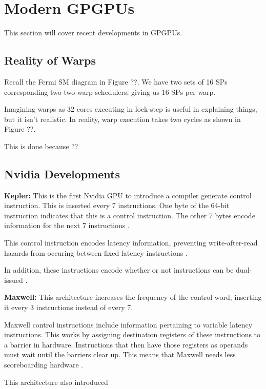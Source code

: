 \section{Modern GPGPUs}

This section will cover recent developments in GPGPUs.

\subsection{Reality of Warps}

Recall the Fermi SM diagram in Figure ??. We have two sets of 16 SPs corresponding
two two warp schedulers, giving us 16 SPs per warp.

Imagining warps as 32 cores executing in lock-step is useful in explaining things,
but it isn't realistic. In reality, warp execution takes two cycles as shown
in Figure ??.

This is done because ??

\subsection{Nvidia Developments}

\textbf{Kepler:} This is the first Nvidia GPU to introduce a compiler generate control instruction.
This is inserted every 7 instructions. One byte of the 64-bit instruction indicates
that this is a control instruction. The other 7 bytes encode information for the
next 7 instructions \cite{chipsandcheeseInsideKepler}.

This control instruction encodes latency information, preventing write-after-read hazards
from occuring between fixed-latency instructions \cite{chipsandcheeseInsideKepler}.

In addition, these instructions encode whether or not instructions can be dual-issued \cite{chipsandcheeseInsideKepler}.

\textbf{Maxwell:} This architecture increases the frequency of the control word,
inserting it every 3 instructions instead of every 7. 

Maxwell control instructions include information pertaining to variable latency
instructions. This works by assigning destination registers of these instructions
to a barrier in hardware. Instructions that then have those
registers as operands must wait until the barriers clear up. This means
that Maxwell needs less scoreboarding hardware \cite{chipsandcheeseMaxwellNvidias}.

This architecture also introduced 
